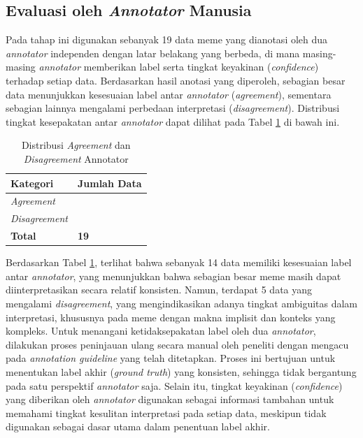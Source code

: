 \subsection{Evaluasi oleh \textit{Annotator} Manusia} \label{IV.EvaluasiAnnotator}
Pada tahap ini digunakan sebanyak 19 data meme yang dianotasi oleh dua \textit{annotator} independen dengan latar belakang yang berbeda, di mana masing-masing \textit{annotator} memberikan label serta tingkat keyakinan (\textit{confidence}) terhadap setiap data. Berdasarkan hasil anotasi yang diperoleh, sebagian besar data menunjukkan kesesuaian label antar \textit{annotator} (\textit{agreement}), sementara sebagian lainnya mengalami perbedaan interpretasi (\textit{disagreement}). Distribusi tingkat kesepakatan antar \textit{annotator} dapat dilihat pada Tabel \ref{tab:agreement_disagreement} di bawah ini.

\begin{table}[H]
    \centering
    \caption{Distribusi \textit{Agreement} dan \textit{Disagreement} Annotator}
    \label{tab:agreement_disagreement}
    \small
    \setlength{\tabcolsep}{4pt}
    \renewcommand{\arraystretch}{1.2}
    \begin{tabular}{>{\centering\arraybackslash}m{3cm} >{\centering\arraybackslash}m{2.8cm}}
        \hline
        \textbf{Kategori} & \textbf{Jumlah Data} \\
        \hline
        \textit{Agreement} & 14 \\
        \textit{Disagreement} & 5 \\
        \hline
        \textbf{Total} & \textbf{19} \\
        \hline
    \end{tabular}
\end{table}

Berdasarkan Tabel \ref{tab:agreement_disagreement}, terlihat bahwa sebanyak 14 data memiliki kesesuaian label antar \textit{annotator}, yang menunjukkan bahwa sebagian besar meme masih dapat diinterpretasikan secara relatif konsisten. Namun, terdapat 5 data yang mengalami \textit{disagreement}, yang mengindikasikan adanya tingkat ambiguitas dalam interpretasi, khususnya pada meme dengan makna implisit dan konteks yang kompleks. Untuk menangani  ketidaksepakatan label oleh dua \textit{annotator}, dilakukan proses peninjauan ulang secara manual oleh peneliti  dengan mengacu pada \textit{annotation guideline} yang telah ditetapkan. Proses ini bertujuan untuk menentukan label akhir (\textit{ground truth}) yang konsisten, sehingga tidak bergantung pada satu perspektif \textit{annotator} saja. Selain itu, tingkat keyakinan (\textit{confidence}) yang diberikan oleh \textit{annotator} digunakan sebagai informasi tambahan untuk memahami tingkat kesulitan interpretasi pada setiap data, meskipun tidak digunakan sebagai dasar utama dalam penentuan label akhir.

